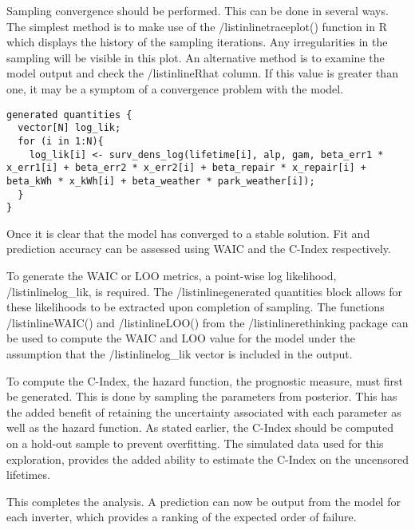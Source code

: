 Sampling convergence should be performed. This can be done in several ways. The simplest method is to make use of the /listinline{traceplot()} function in R which displays the history of the sampling iterations. Any irregularities in the sampling will be visible in this plot. An alternative method is to examine the model output and check the /listinline{Rhat} column. If this value is greater than one, it may be a symptom of a convergence problem with the model.

\begin{lstlisting}
generated quantities {
  vector[N] log_lik;
  for (i in 1:N){
  	log_lik[i] <- surv_dens_log(lifetime[i], alp, gam, beta_err1 * x_err1[i] + beta_err2 * x_err2[i] + beta_repair * x_repair[i] + beta_kWh * x_kWh[i] + beta_weather * park_weather[i]);
  }
}
\end{lstlisting}

Once it is clear that the model has converged to a stable solution. Fit and prediction accuracy can be assessed using WAIC and the C-Index respectively. 

To generate the WAIC or LOO metrics, a point-wise log likelihood, /listinline{log\_lik}, is required. The /listinline{generated quantities{}} block allows for these likelihoods to be extracted upon completion of sampling. The functions /listinline{WAIC()} and /listinline{LOO()} from the /listinline{rethinking} package can be used to compute the WAIC and LOO value for the model under the assumption that the /listinline{log\_lik} vector is included in the output. 

To compute the C-Index, the hazard function, the prognostic measure, must first be generated. This is done by sampling the parameters from posterior. This has the added benefit of retaining the uncertainty associated with each parameter as well as the hazard function. As stated earlier, the C-Index should be computed on a hold-out sample to prevent overfitting. The simulated data used for this exploration, provides the added ability to estimate the C-Index on the uncensored lifetimes. 

This completes the analysis. A prediction can now be output from the model for each inverter, which provides a ranking of the expected order of failure. 



